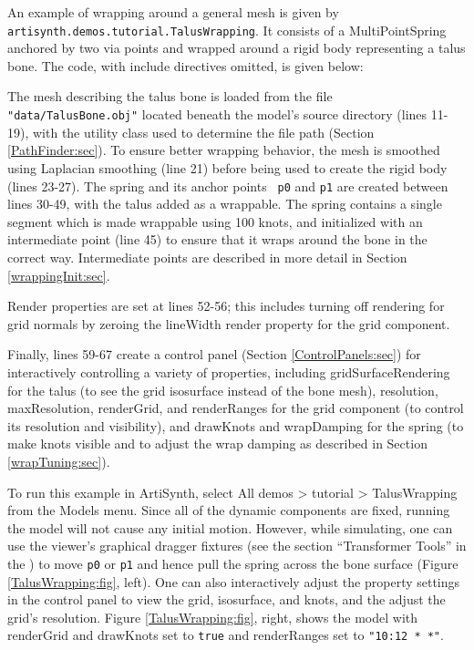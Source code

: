 An example of wrapping around a general mesh is given by
{\tt artisynth.demos.tutorial.TalusWrapping}.  It consists
of a MultiPointSpring anchored by two via points and wrapped around a
rigid body representing a talus bone. The code, with include
directives omitted, is given below: 
\lstset{numbers=left}
\iflatexml

\else

\fi
\lstset{numbers=none}

The mesh describing the talus bone is loaded from the file {\tt
"data/TalusBone.obj"} located beneath the model's source directory
(lines 11-19), with the utility class
 used to determine the file path
(Section \ref{PathFinder:sec}).
To ensure better wrapping behavior, the mesh is smoothed
using Laplacian smoothing (line 21) before being used to create
the rigid body (lines 23-27). The spring and its anchor points {\tt
p0} and {\tt p1} are created between lines 30-49, with the talus added
as a wrappable. The spring contains a single segment which is made
wrappable using 100 knots, and initialized with an intermediate point
(line 45) to ensure that it wraps around the bone in the correct way.
Intermediate points are described in more detail in Section
\ref{wrappingInit:sec}.

Render properties are set at lines 52-56; this includes turning off
rendering for grid normals by zeroing the {\sf lineWidth} render
property for the grid component.

Finally, lines 59-67 create a control panel (Section
\ref{ControlPanels:sec}) for interactively controlling a variety of
properties, including {\sf gridSurfaceRendering} for the talus (to see
the grid isosurface instead of the bone mesh), {\sf resolution}, {\sf
maxResolution}, {\sf renderGrid}, and {\sf renderRanges} for the grid
component (to control its resolution and visibility), and {\sf
drawKnots} and {\sf wrapDamping} for the spring (to make knots visible
and to adjust the wrap damping as described in Section
\ref{wrapTuning:sec}).

To run this example in ArtiSynth, select {\sf All demos > tutorial >
TalusWrapping} from the {\sf Models} menu. Since all of the dynamic
components are fixed, running the model will not cause any initial
motion. However, while simulating, one can use the viewer's graphical
dragger fixtures (see the section ``Transformer Tools'' in the
) to move
{\tt p0} or {\tt p1} and hence pull the spring across the bone surface
(Figure \ref{TalusWrapping:fig}, left). One can also interactively
adjust the property settings in the control panel to view the grid,
isosurface, and knots, and the adjust the grid's resolution.  Figure
\ref{TalusWrapping:fig}, right, shows the model with {\sf renderGrid}
and {\sf drawKnots} set to {\tt true} and {\sf renderRanges} set to
{\tt "10:12 * *"}.

